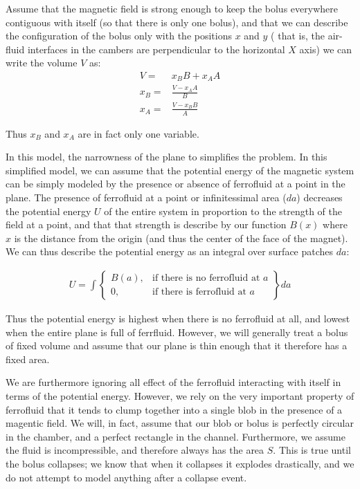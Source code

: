 \documentclass{asme2ej}
\begin{document}
Assume that the magnetic field is strong enough to keep the bolus everywhere
contiguous with itself (so that there is only one bolus), and that we can
describe the configuration of the bolus only with the positions $x$ and $y$ (
that is, the air-fluid interfaces in the cambers are perpendicular to the horizontal $X$ axis)
we can write the
volume $V$ as:
\begin{align}
  V = & x_BB + x_AA \\
  x_B = & \frac{V - x_AA}{B} \\
  x_A = & \frac{V - x_BB}{A}
  \label{eqn:yvalue}
\end{align}

Thus $x_B$ and $x_A$ are in fact only one variable.

In this model,  the narrowness of the plane to simplifies
the problem. In this simplified model, we can assume
that the potential energy of the magnetic system can be simply
modeled by the presence or absence of ferrofluid at a point in the plane.
The presence of ferrofluid at a point or infinitessimal area ($da$) decreases the potential energy $U$
of the entire system in proportion to the strength of the field at a point,
and that that strength is describe by our function $B(x)$ where $x$ is the
distance from the origin (and thus the center of the face of the magnet).
We can thus describe the potential energy as an integral over surface patches $da$:

\begin{align}
  U = \int
\left\{
    \begin{array}{lr}
      B(a)  , & \text{if there is no ferrofluid at } a \\
      0 , & \text{if there is ferrofluid at } a
    \end{array}
\right\} da
\end{align}

Thus the potential energy is highest when there is no ferrofluid at all,
and lowest when the entire plane is full of ferrfluid.
However, we will generally treat a bolus of fixed volume and assume
that our plane is thin enough that it therefore has a fixed area.


We are furthermore ignoring all effect of the ferrofluid
interacting with itself in terms
of the potential energy.
However, we rely on the very important property of ferrofluid that
it tends to clump together into a single blob in the presence
of a magentic field.
We will, in fact, assume that our blob or bolus is perfectly
circular in the chamber,
and a perfect rectangle in the channel. Furthermore,
we assume the fluid is incompressible,
and therefore always has the area $S$.
This is true until the bolus collapses; we know that
when it collapses it explodes drastically,
and we do not attempt to model anything after
a collapse event.
\end{document}
